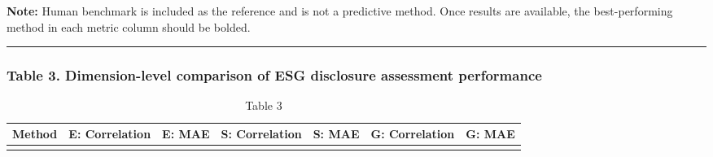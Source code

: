 \documentclass[
  12pt,
]{article}
\begin{document}
\textbf{Note:} Human benchmark is included as the reference and is not a
predictive method. Once results are available, the best-performing
method in each metric column should be bolded.

\begin{center}\rule{0.5\linewidth}{0.5pt}\end{center}

\subsubsection{Table 3. Dimension-level comparison of ESG disclosure
assessment
performance}\label{table-3.-dimension-level-comparison-of-esg-disclosure-assessment-performance}

\begin{longtable}[]{@{}
  >{\raggedright\arraybackslash}p{}
  >{\raggedleft\arraybackslash}p{}
  >{\raggedleft\arraybackslash}p{}
  >{\raggedleft\arraybackslash}p{}
  >{\raggedleft\arraybackslash}p{}
  >{\raggedleft\arraybackslash}p{}
  >{\raggedleft\arraybackslash}p{}@{}}
\caption{Table 3}\label{tbl-comparison}\tabularnewline
\toprule\noalign{}
\begin{minipage}[b]{\linewidth}\raggedright
Method
\end{minipage} & \begin{minipage}[b]{\linewidth}\raggedleft
E: Correlation
\end{minipage} & \begin{minipage}[b]{\linewidth}\raggedleft
E: MAE
\end{minipage} & \begin{minipage}[b]{\linewidth}\raggedleft
S: Correlation
\end{minipage} & \begin{minipage}[b]{\linewidth}\raggedleft
S: MAE
\end{minipage} & \begin{minipage}[b]{\linewidth}\raggedleft
G: Correlation
\end{minipage} & \begin{minipage}[b]{\linewidth}\raggedleft
G: MAE
\end{minipage} \\
\midrule\noalign{}
\endfirsthead
\toprule\noalign{}

\end{longtable}
\end{document}
